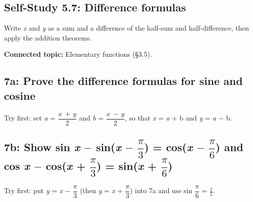 \documentclass[11pt]{article}
\begin{document}
\begin{keepsection}
\section{Self-Study 5.7: Difference formulas}

Write \textit{x} and \textit{y} as a sum and a difference of the half-sum and half-difference, then apply the addition theorems.

\textbf{Connected topic:} Elementary functions (§3.5).

\begin{keepsection}
\subsection{7a: Prove the difference formulas for sine and cosine}

Try first: set \textit{a} = {\small\ensuremath{\dfrac{{x}\, +\, {y}}{2}}} and \textit{b} = {\small\ensuremath{\dfrac{{x}\, -\, {y}}{2}}}, so that \textit{x} = \textit{a} + b and \textit{y} = \textit{a} \ensuremath{-} b.

\end{keepsection}

\begin{keepsection}
\subsection{7b: Show sin \textit{x} \ensuremath{-} sin(\textit{x} \ensuremath{-} {\small\ensuremath{\dfrac{π}{3}}}) = cos(\textit{x} \ensuremath{-} {\small\ensuremath{\dfrac{π}{6}}}) and cos \textit{x} \ensuremath{-} cos(\textit{x} + {\small\ensuremath{\dfrac{π}{3}}}) = sin(\textit{x} + {\small\ensuremath{\dfrac{π}{6}}})}

Try first: put \textit{y} = \textit{x} \ensuremath{-} {\small\ensuremath{\dfrac{π}{3}}} (then \textit{y} = \textit{x} + {\small\ensuremath{\dfrac{π}{3}}}) into 7a and use sin {\small\ensuremath{\dfrac{π}{6}}} = \ensuremath{\tfrac12}.

\end{keepsection}


\end{keepsection}
\end{document}
